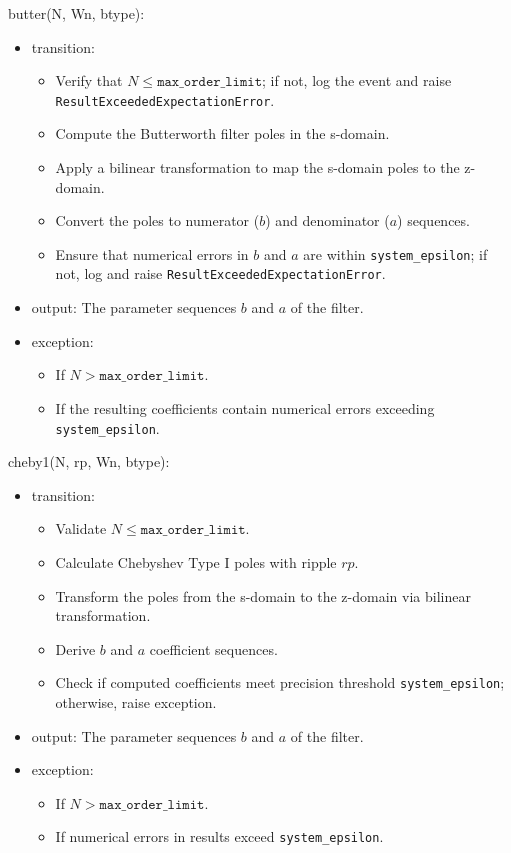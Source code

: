 \documentclass[12pt, titlepage]{article}
\begin{document}
\noindent butter(N, Wn, btype):
\begin{itemize}
\item transition:
    \begin{itemize}
    \item Verify that $N \leq \texttt{max\_order\_limit}$; if not, log the event
    and raise \texttt{ResultExceededExpectationError}.
    \item Compute the Butterworth filter poles in the s-domain.
    \item Apply a bilinear transformation to map the s-domain poles to the
    z-domain.
    \item Convert the poles to numerator ($b$) and denominator ($a$) sequences.
    \item Ensure that numerical errors in $b$ and $a$ are within
    \texttt{system\_epsilon}; if not, log and raise
    \texttt{ResultExceededExpectationError}.
    \end{itemize}
\item output: The parameter sequences $b$ and $a$ of the filter.
\item exception: 
    \begin{itemize}
    \item If $N > \texttt{max\_order\_limit}$.
    \item If the resulting coefficients contain numerical errors exceeding
    \texttt{system\_epsilon}.
    \end{itemize}
\end{itemize}

\noindent cheby1(N, rp, Wn, btype):
\begin{itemize}
\item transition:
    \begin{itemize}
    \item Validate $N \leq \texttt{max\_order\_limit}$.
    \item Calculate Chebyshev Type I poles with ripple $rp$.
    \item Transform the poles from the s-domain to the z-domain via bilinear
    transformation.
    \item Derive $b$ and $a$ coefficient sequences.
    \item Check if computed coefficients meet precision threshold
    \texttt{system\_epsilon}; otherwise, raise exception.
    \end{itemize}
\item output: The parameter sequences $b$ and $a$ of the filter.
\item exception:
    \begin{itemize}
    \item If $N > \texttt{max\_order\_limit}$.
    \item If numerical errors in results exceed \texttt{system\_epsilon}.
    \end{itemize}
\end{itemize}
\end{document}
